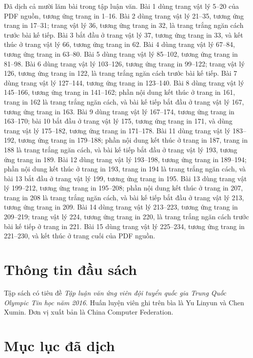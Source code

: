 \documentclass[11pt]{article}
\begin{document}
Đã dịch cả mười lăm bài trong tập luận văn. Bài 1 dùng trang vật lý
5--20 của PDF nguồn, tương ứng trang in 1--16. Bài 2 dùng trang vật lý 21--35,
tương ứng trang in 17--31; trang vật lý 36, tương ứng trang in 32, là trang
trắng ngăn cách trước bài kế tiếp. Bài 3 bắt đầu ở trang vật lý 37, tương ứng
trang in 33, và kết thúc ở trang vật lý 66, tương ứng trang in 62. Bài 4 dùng
trang vật lý 67--84, tương ứng trang in 63--80. Bài 5 dùng trang vật lý
85--102, tương ứng trang in 81--98. Bài 6 dùng trang vật lý 103--126, tương
ứng trang in 99--122; trang vật lý 126, tương ứng trang in 122, là trang trắng
ngăn cách trước bài kế tiếp. Bài 7 dùng trang vật lý 127--144, tương ứng trang
in 123--140. Bài 8 dùng trang vật lý 145--166, tương ứng trang in 141--162;
phần nội dung kết thúc ở trang in 161, trang in 162 là trang trắng ngăn cách,
và bài kế tiếp bắt đầu ở trang vật lý 167, tương ứng trang in 163. Bài 9 dùng
trang vật lý 167--174, tương ứng trang in 163--170; bài 10 bắt đầu ở trang vật
lý 175, tương ứng trang in 171, và dùng trang vật lý 175--182, tương ứng trang
in 171--178. Bài 11 dùng trang vật lý 183--192, tương ứng trang in 179--188;
phần nội dung kết thúc ở trang in 187, trang in 188 là trang trắng ngăn cách,
và bài kế tiếp bắt đầu ở trang vật lý 193, tương ứng trang in 189. Bài 12 dùng
trang vật lý 193--198, tương ứng trang in 189--194; phần nội dung kết thúc ở
trang in 193, trang in 194 là trang trắng ngăn cách, và bài 13 bắt đầu ở trang
vật lý 199, tương ứng trang in 195. Bài 13 dùng trang vật lý 199--212, tương
ứng trang in 195--208; phần nội dung kết thúc ở trang in 207, trang in 208 là
trang trắng ngăn cách, và bài kế tiếp bắt đầu ở trang vật lý 213, tương ứng
trang in 209. Bài 14 dùng trang vật lý 213--223, tương ứng trang in 209--219;
trang vật lý 224, tương ứng trang in 220, là trang trắng ngăn cách trước bài
kế tiếp ở trang in 221. Bài 15 dùng trang vật lý 225--234, tương ứng trang
in 221--230, và kết thúc ở trang cuối của PDF nguồn.

\section{Thông tin đầu sách}

Tập sách có tiêu đề \emph{Tập luận văn ứng viên đội tuyển quốc gia Trung Quốc
Olympic Tin học năm 2016}. Huấn luyện viên ghi trên bìa là Yu Linyun và Chen
Xumin. Đơn vị xuất bản là China Computer Federation.

\section{Mục lục đã dịch}
\end{document}
